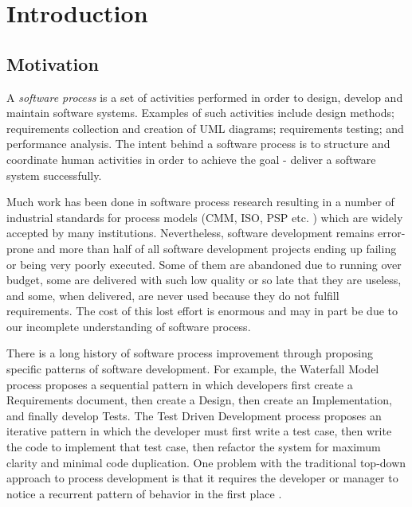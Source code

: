 \chapter{Introduction}
\section{Motivation}
A \textit{software process} is a set of activities performed in order to design, develop and maintain software systems. Examples of such activities include design methods; requirements collection and creation of UML diagrams; requirements testing; and performance analysis. The intent behind a software process is to structure and coordinate human activities in order to achieve the goal - deliver a software system successfully.

Much work has been done in software process research resulting in a number of industrial standards for process models (CMM, ISO, PSP etc. \cite{citeulike:5043104}) which are widely accepted by many institutions. Nevertheless, software development remains error-prone and more than half of all software development projects ending up failing or being very poorly executed. Some of them are abandoned due to running over budget, some are delivered with such low quality or so late that they are useless, and some, when delivered, are never used because they do not fulfill requirements. The cost of this lost effort is enormous and may in part be due to our incomplete understanding of software process.

There is a long history of software process improvement through proposing specific patterns of software development. For example, the Waterfall Model process proposes a sequential pattern in which developers first create a Requirements document, then create a Design, then create an Implementation, and finally develop Tests. The Test Driven Development process proposes an iterative pattern in which the developer must first write a test case, then write the code to implement that test case, then refactor the system for maximum clarity and minimal code duplication. One problem with the traditional top-down approach to process development is that it requires the developer or manager to notice a recurrent pattern of behavior in the first place \cite{citeulike:5043104}. 

